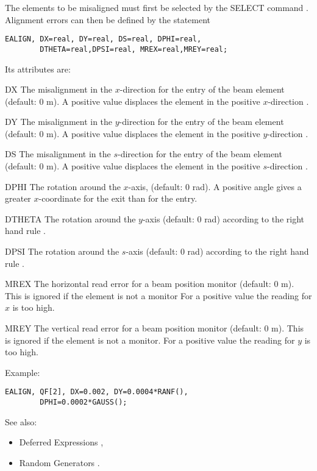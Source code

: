 The elements to be misaligned must first be selected by the
{SELECT} command .
Alignment errors can then be defined by the statement
\begin{verbatim}
EALIGN, DX=real, DY=real, DS=real, DPHI=real,
        DTHETA=real,DPSI=real, MREX=real,MREY=real;
\end{verbatim}
Its attributes are:
\begin{kdescription}
\item[DX]
  The misalignment in the $x$-direction
  for the entry of the beam element (default: 0 m).
  A positive value displaces the element
  in the positive $x$-direction .
\item[DY]
  The misalignment in the $y$-direction
  for the entry of the beam element (default: 0 m).
  A positive value displaces the element
  in the positive $y$-direction .
\item[DS]
  The misalignment in the $s$-direction
  for the entry of the beam element (default: 0 m).
  A positive value displaces the element
  in the positive $s$-direction .
\item[DPHI]
  The rotation around the $x$-axis, (default: 0 rad).
  A positive angle  gives a greater $x$-coordinate for the exit
  than for the entry.
\item[DTHETA]
  The rotation around the $y$-axis (default: 0 rad) according to
  the right hand rule .
\item[DPSI]
  The rotation around the $s$-axis (default: 0 rad) according to
  the right hand rule .
\item[MREX]
  The horizontal read error for a beam position monitor (default: 0 m).
  This is ignored if the element is not a monitor
  For a positive value  the reading for $x$ is too high.
\item[MREY]
  The vertical read error for a beam position monitor (default: 0 m).
  This is ignored if the element is not a monitor.
  For a positive value  the reading for $y$ is too high.
\end{kdescription}
Example:
\begin{verbatim}
EALIGN, QF[2], DX=0.002, DY=0.0004*RANF(),
        DPHI=0.0002*GAUSS();
\end{verbatim}
See also:
\begin{itemize}
\item Deferred Expressions ,
\item Random Generators .
\end{itemize}

